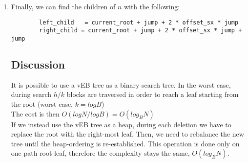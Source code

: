 \documentclass[a4paper]{article}
\begin{document}
\begin{enumerate}
\item Finally, we can find the children of $n$ with the following:\\
	\begin{verbatim}
		left_child   = current_root + jump + 2 * offset_sx * jump
		right_child = current_root + jump + 2 * offset_sx * jump + jump
	\end{verbatim}


\subsection*{Discussion}
It is possible to use a vEB tree as a binary search tree. In the worst case, during search $h/k$ blocks are traversed in order to reach a leaf starting from the root (worst case, $k = log B$)\\
The cost is then $O(log N / log B) = O(log_B N)$\\

If we instead use the vEB tree as a heap, during each deletion we have to replace the root with the right-most leaf. Then, we need to rebalance the new tree until the heap-ordering is re-established. This operation is done only on one path root-leaf, therefore the complexity stays the same, $O(log_B N)$.

\end{enumerate}
\end{document}
